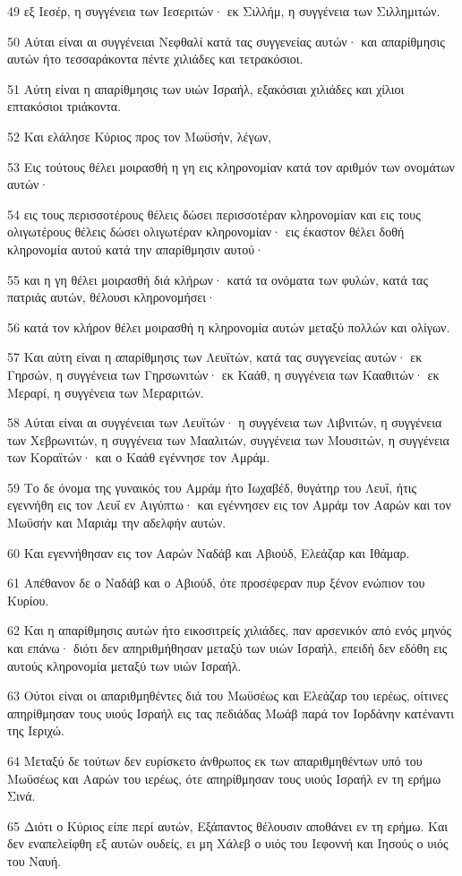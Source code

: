 \par 49 εξ Ιεσέρ, η συγγένεια των Ιεσεριτών· εκ Σιλλήμ, η συγγένεια των Σιλλημιτών.
\par 50 Αύται είναι αι συγγένειαι Νεφθαλί κατά τας συγγενείας αυτών· και απαρίθμησις αυτών ήτο τεσσαράκοντα πέντε χιλιάδες και τετρακόσιοι.
\par 51 Αύτη είναι η απαρίθμησις των υιών Ισραήλ, εξακόσιαι χιλιάδες και χίλιοι επτακόσιοι τριάκοντα.
\par 52 Και ελάλησε Κύριος προς τον Μωϋσήν, λέγων,
\par 53 Εις τούτους θέλει μοιρασθή η γη εις κληρονομίαν κατά τον αριθμόν των ονομάτων αυτών·
\par 54 εις τους περισσοτέρους θέλεις δώσει περισσοτέραν κληρονομίαν και εις τους ολιγωτέρους θέλεις δώσει ολιγωτέραν κληρονομίαν· εις έκαστον θέλει δοθή κληρονομία αυτού κατά την απαρίθμησιν αυτού·
\par 55 και η γη θέλει μοιρασθή διά κλήρων· κατά τα ονόματα των φυλών, κατά τας πατριάς αυτών, θέλουσι κληρονομήσει·
\par 56 κατά τον κλήρον θέλει μοιρασθή η κληρονομία αυτών μεταξύ πολλών και ολίγων.
\par 57 Και αύτη είναι η απαρίθμησις των Λευϊτών, κατά τας συγγενείας αυτών· εκ Γηρσών, η συγγένεια των Γηρσωνιτών· εκ Καάθ, η συγγένεια των Κααθιτών· εκ Μεραρί, η συγγένεια των Μεραριτών.
\par 58 Αύται είναι αι συγγένειαι των Λευϊτών· η συγγένεια των Λιβνιτών, η συγγένεια των Χεβρωνιτών, η συγγένεια των Μααλιτών, συγγένεια των Μουσιτών, η συγγένεια των Κοραϊτών· και ο Καάθ εγέννησε τον Αμράμ.
\par 59 Το δε όνομα της γυναικός του Αμράμ ήτο Ιωχαβέδ, θυγάτηρ του Λευΐ, ήτις εγεννήθη εις τον Λευΐ εν Αιγύπτω· και εγέννησεν εις τον Αμράμ τον Ααρών και τον Μωϋσήν και Μαριάμ την αδελφήν αυτών.
\par 60 Και εγεννήθησαν εις τον Ααρών Ναδάβ και Αβιούδ, Ελεάζαρ και Ιθάμαρ.
\par 61 Απέθανον δε ο Ναδάβ και ο Αβιούδ, ότε προσέφεραν πυρ ξένον ενώπιον του Κυρίου.
\par 62 Και η απαρίθμησις αυτών ήτο εικοσιτρείς χιλιάδες, παν αρσενικόν από ενός μηνός και επάνω· διότι δεν απηριθμήθησαν μεταξύ των υιών Ισραήλ, επειδή δεν εδόθη εις αυτούς κληρονομία μεταξύ των υιών Ισραήλ.
\par 63 Ούτοι είναι οι απαριθμηθέντες διά του Μωϋσέως και Ελεάζαρ του ιερέως, οίτινες απηρίθμησαν τους υιούς Ισραήλ εις τας πεδιάδας Μωάβ παρά τον Ιορδάνην κατέναντι της Ιεριχώ.
\par 64 Μεταξύ δε τούτων δεν ευρίσκετο άνθρωπος εκ των απαριθμηθέντων υπό του Μωϋσέως και Ααρών του ιερέως, ότε απηρίθμησαν τους υιούς Ισραήλ εν τη ερήμω Σινά.
\par 65 Διότι ο Κύριος είπε περί αυτών, Εξάπαντος θέλουσιν αποθάνει εν τη ερήμω. Και δεν εναπελείφθη εξ αυτών ουδείς, ει μη Χάλεβ ο υιός του Ιεφοννή και Ιησούς ο υιός του Ναυή.

